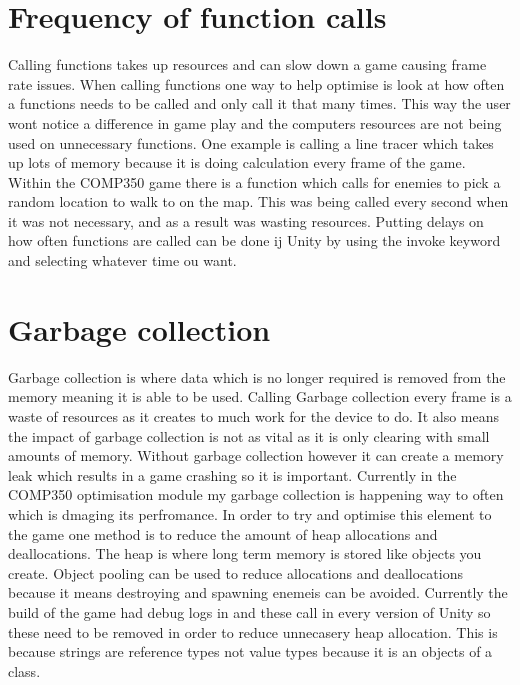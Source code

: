 \documentclass[journal]{IEEEtran}
\begin{document}
\section{Frequency of function calls}
Calling functions takes up resources and can slow down a game causing frame rate issues.%
When calling functions one way to help optimise is look at how often a functions needs to be called and only call it that many times.
This way the user wont notice a difference in game play and the computers resources are not being used on unnecessary functions.
One example is calling a line tracer which takes up lots of memory because it is doing calculation every frame of the game.
Within the COMP350 game there is a function which calls for enemies to pick a random location to walk to on the map.
This was being called every second when it was not necessary, and as a result was wasting resources.
Putting delays on how often functions are called can be done ij Unity by using the invoke keyword and selecting whatever time ou want.

\section{Garbage collection}
Garbage collection is where data which is no longer required is removed from the memory meaning it is able to be used.%
Calling Garbage collection every frame is a waste of resources as it creates to much work for the device to do.
It also means the impact of garbage collection is not as vital as it is only clearing with small amounts of memory.
Without garbage collection however it can create a memory leak which results in a game crashing so it is important.
Currently in the COMP350 optimisation module my garbage collection is happening way to often which is dmaging its perfromance.
In order to try and optimise this element to the game one method is to reduce the amount of heap allocations and deallocations.
The heap is where long term memory is stored like objects you create.%
Object pooling can be used to reduce allocations and deallocations because it means destroying and spawning enemeis can be avoided.
Currently the build of the game had debug logs in and these call in every version of Unity so these need to be removed in order to reduce unnecasery heap allocation. 
This is because strings are reference types not value types because it is an objects of a class.
\end{document}
